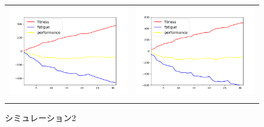 \documentclass[12pt,fleqn]{jreport}
\begin{document}
\begin{figure}[H]
  \begin{tabular}{cc}
    \begin{minipage}[t]{0.45\hsize}
      \centering
      \includegraphics[scale=0.5]{sim1.png}
      \caption{シミュレーション1}
    \end{minipage} &
    \begin{minipage}[t]{0.45\hsize}
      \centering
      \includegraphics[scale=0.5]{sim2.png}
      \caption{シミュレーション2}
    \end{minipage}   \\
    \begin{minipage}[t]{0.45\hsize}
      \centering

\end{minipage}
\end{tabular}
\end{figure}
\end{document}
